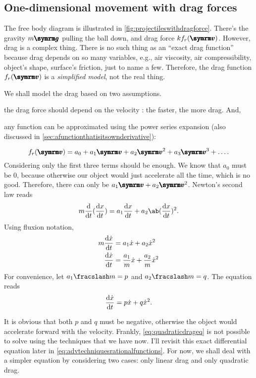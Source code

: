 \subsection{One-dimensional movement with drag forces}

The free body diagram is illustrated in \cref{fig:projectileswithdragforce}. There's the gravity $m\vv{g}$ pulling the ball down, and drag force $kf_r(\vv{v})$. However, drag is a complex thing. There is no such thing as an ``exact drag function'' because drag depends on so many variables, e.g., air viscosity, air compressibility, object's shape, surface's friction, just to name a few. Therefore, the drag function $f_r(\vv{v})$ is a \emph{simplified model}, not the real thing.

We shall model the drag based on two assumptions. \begin{enumerate*}[label = \roman*.)]
    \item the drag force should depend on the velocity : the faster, the more drag. And,
    \item any function can be approximated using the power series expansion (also discussed in \cref{sec:afunctionthatisitsownderivative}):
\end{enumerate*}
\begin{equation*}
    f_r(\vv{v}) = a_0 + a_1\vv{v} + a_2\vv{v}^2 + a_3\vv{v}^3 + \dots.
\end{equation*}
Considering only the first three terms should be enough. We know that $a_0$ must be $0$, because otherwise our object would just accelerate all the time, which is no good. Therefore, there can only be $a_1\vv{v} + a_2\vv{v}^2$. Newton's second law reads
\begin{equation*}
	m\odv*{(\odv{x}{t})}{t} = a_1\odv{x}{t} + a_2\ab(\odv{x}{t})^2.
\end{equation*}
Using fluxion notation,
\begin{align*}
    m\odv{\dot{x}}{t} &= a_1\dot{x} + a_2\dot{x}^2 \\
    \odv{\dot{x}}{t} &= \frac{a_1}{m}\dot{x} + \frac{a_2}{m}\dot{x}^2
\end{align*}
For convenience, let $\flatfrac{a_1}{m} = p$ and $\flatfrac{a_2}{m} = q$. The equation reads
\begin{equation}
    \odv{\dot{x}}{t} = p\dot{x} + q\dot{x}^2. \label{eq:quadraticdrageq}
\end{equation}

It is obvious that both $p$ and $q$ must be negative, otherwise the object would accelerate forward with the velocity. Frankly, \cref{eq:quadraticdrageq} is not possible to solve using the techniques that we have now. I'll revisit this exact differential equation later in \cref{eq:advtechniquesrationalfunctions}. For now, we shall deal with a simpler equation by considering two cases: only linear drag and only quadratic drag.


